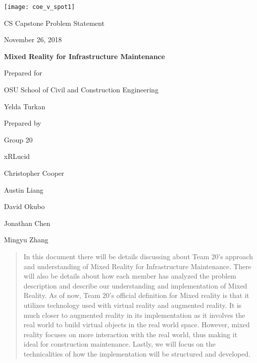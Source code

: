 \documentclass[onecolumn, draftclsnofoot,10pt, compsoc]{IEEEtran}
\def \CapstoneTeamName{		xRLucid}
\def \CapstoneTeamNumber{		20}
\def \GroupMemberOne{			Christopher Cooper}
\def \GroupMemberTwo{			Austin Liang}
\def \GroupMemberThree{			David Okubo}
\def \GroupMemberFour{			Jonathan Chen}
\def \GroupMemberFive{			Mingyu Zhang}
\def \CapstoneProjectName{		Mixed Reality for Infrastructure Maintenance}
\def \CapstoneSponsorCompany{	OSU School of Civil and Construction Engineering}
\def \CapstoneSponsorPerson{		Yelda Turkan}
\def \DocType{	Problem Statement
				}
\newcommand{\NameSigPair}[1]{\par
\makebox[2.75in][r]{#1} \hfil 	\makebox[3.25in]{\makebox[2.25in]{\hrulefill} \hfill		\makebox[.75in]{\hrulefill}}
\par\vspace{-12pt} \textit{\tiny\noindent
\makebox[2.75in]{} \hfil		\makebox[3.25in]{\makebox[2.25in][r]{Signature} \hfill	\makebox[.75in][r]{Date}}}}
\renewcommand{\NameSigPair}[1]{#1}
\begin{document}
\begin{titlepage}
    \begin{singlespace}
    	\texttt{[image: coe\_v\_spot1]}
        \hfill
        \par\vspace{.2in}
        \centering
        \scshape{
            \huge CS Capstone \DocType \par
            {\large November 26, 2018}\par
            \vspace{.5in}
            \textbf{\Huge\CapstoneProjectName}\par
            \vfill
            {\large Prepared for}\par
            \Huge \CapstoneSponsorCompany\par
            \vspace{5pt}
            {\Large\NameSigPair{\CapstoneSponsorPerson}\par}
            {\large Prepared by }\par
            Group\CapstoneTeamNumber\par
            \CapstoneTeamName\par
            \vspace{5pt}
            {\Large
                \NameSigPair{\GroupMemberOne}\par
                \NameSigPair{\GroupMemberTwo}\par
                \NameSigPair{\GroupMemberThree}\par
                \NameSigPair{\GroupMemberFour}\par
                \NameSigPair{\GroupMemberFive}\par
            }
            \vspace{20pt}
        }

\begin{abstract}
In this document there will be details discussing about Team 20's approach and understanding of Mixed Reality for Infrastructure Maintenance. There will also be details about how each member has analyzed the problem description and describe our understanding and implementation of Mixed Reality. As of now, Team 20's official definition for Mixed reality is that it utilizes technology used with virtual reality and augmented reality. It is much closer to augmented reality in its implementation as it involves the real world to build virtual objects in the real world space. However, mixed reality focuses on more interaction with the real world, thus making it ideal for construction maintenance. Lastly, we will focus on the technicalities of how the implementation will be structured and developed.
\end{abstract}
\end{singlespace}
\end{titlepage}
\newpage
\end{document}
